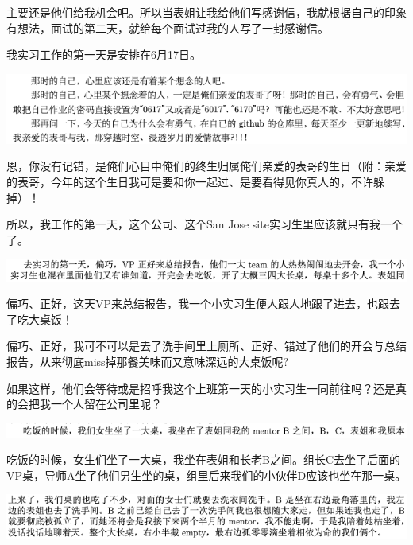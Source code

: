 \documentclass[9pt, b5paper]{article}
\begin{document}
主要还是他们给我机会吧。所以当表姐让我给他们写感谢信，我就根据自己的印象有想法，面试的第二天，就给每个面试过我的人写了一封感谢信。

我实习工作的第一天是安排在6月17日。

\begin{center}
\includegraphics[width=.9\linewidth]{./pic/backups_plans_20210504_210709.png}
\end{center}

恩，你没有记错，是俺们心目中俺们的终生归属俺们亲爱的表哥的生日（附：亲爱的表哥，今年的这个生日我可是要和你一起过、是要看得见你真人的，不许躲掉）！

所以，我工作的第一天，这个公司、这个San Jose site实习生里应该就只有我一个了。

\begin{center}
\includegraphics[width=.9\linewidth]{./pic/backups_plans_20210504_210919.png}
\end{center}

偏巧、正好，这天VP来总结报告，我一个小实习生便人跟人地跟了进去，也跟去了吃大桌饭！

偏巧、正好，我可不可以是去了洗手间里上厕所、正好、错过了他们的开会与总结报告，从来彻底miss掉那餐美味而又意味深远的大桌饭呢?

如果这样，他们会等待或是招呼我这个上班第一天的小实习生一同前往吗？还是真的会把我一个人留在公司里呢？

\begin{center}
\includegraphics[width=.9\linewidth]{./pic/backups_plans_20210504_211249.png}
\end{center}

吃饭的时候，女生们坐了一大桌，我坐在表姐和长老B之间。组长C去坐了后面的VP桌，导师A坐了他们男生坐的桌，组里后来我们的小伙伴D应该也坐在那一桌。

\begin{center}
\includegraphics[width=.9\linewidth]{./pic/backups_plans_20210504_211634.png}
\end{center}
\end{document}
